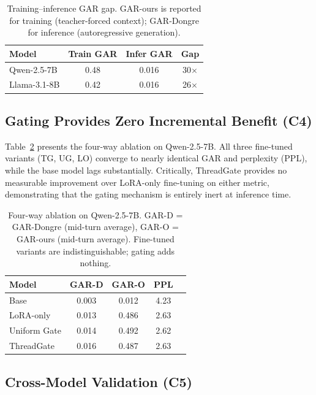 \documentclass[11pt]{article}
\begin{document}
\begin{table}[t]
\centering
\small
\begin{tabular}{lccc}
\toprule
\textbf{Model} & \textbf{Train GAR} & \textbf{Infer GAR} & \textbf{Gap} \\
\midrule
Qwen-2.5-7B & 0.48 & 0.016 & 30$\times$ \\
Llama-3.1-8B & 0.42 & 0.016 & 26$\times$ \\
\bottomrule
\end{tabular}
\caption{Training--inference GAR gap. GAR-ours is reported for training (teacher-forced context); GAR-Dongre for inference (autoregressive generation).}
\label{tab:train-infer-gap}
\end{table}

\subsection{Gating Provides Zero Incremental Benefit (C4)}
\label{sec:four-way}

Table~\ref{tab:four-way-qwen} presents the four-way ablation on Qwen-2.5-7B. All three fine-tuned variants (TG, UG, LO) converge to nearly identical GAR and perplexity (PPL), while the base model lags substantially. Critically, ThreadGate provides no measurable improvement over LoRA-only fine-tuning on either metric, demonstrating that the gating mechanism is entirely inert at inference time.

\begin{table}[t]
\centering
\small
\begin{tabular}{lcccc}
\toprule
\textbf{Model} & \textbf{GAR-D} & \textbf{GAR-O} & \textbf{PPL} \\
\midrule
Base & 0.003 & 0.012 & 4.23 \\
LoRA-only & 0.013 & 0.486 & 2.63 \\
Uniform Gate & 0.014 & 0.492 & 2.62 \\
ThreadGate & 0.016 & 0.487 & 2.63 \\
\bottomrule
\end{tabular}
\caption{Four-way ablation on Qwen-2.5-7B. GAR-D = GAR-Dongre (mid-turn average), GAR-O = GAR-ours (mid-turn average). Fine-tuned variants are indistinguishable; gating adds nothing.}
\label{tab:four-way-qwen}
\end{table}

\subsection{Cross-Model Validation (C5)}
\end{document}
